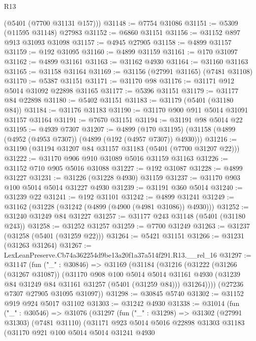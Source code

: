 \begin{lexlean}{R13}
\begin{coremodule}
      (@5401 (@7700 @31131 @157)))
@31148 := @7754 @31086
@31151 := @5309 (@11595 @31148) @27983
@31152 := @6860 @31151
@31156 := @31152 @897 @913 @31093 @31098
@31157 := @4945 @27905
@31158 := @4899 @31157
@31159 := @192 @31095
@31160 := @4899 @31159
@31161 := @170 @31097
@31162 := @4899 @31161
@31163 := @31162 @4930
@31164 := @31160 @31163
@31165 := @31158 @31164
@31169 := @31156 (@27991 @31165) (@7481 @31108)
@31170 := @5387 @31151
@31171 := @31170 @98
@31176 := @31171 @912 @5014 @31092 @22898 @31165
@31177 := @5396 @31151
@31179 := @31177 @84 @22898
@31180 := @5402 @31151
@31183 := @31179 (@5401 (@31180 @84))
@31184 := @31176 @31183
@31190 := @31170 @900 @911 @5014 @31091 @31157 @31164
@31191 := @7670 @31151
@31194 := @31191 @98 @5014 @22
@31195 := @4939 @7307
@31207 := @4899
    (@170 @31195)
    (@31158 (@4899 (@4952 (@4953 @7307)) (@4899 (@192 (@4957 @7307)) @4930)))
@31216 := @31190 (@31194 @31207 @84 @31157 @31183 (@5401 (@7700 @31207 @22)))
@31222 := @31170 @906 @910 @31089 @5016 @31159 @31163
@31226 := @31152 @710 @905 @5016 @31088
@31227 := @192 @31087
@31228 := @4899 @31227
@31231 := @31226 (@31228 @4930) @31159
@31237 := @31170 @903 @100 @5014 @5014 @31227 @4930
@31239 := @31191 @360 @5014
@31240 := @31239 @22
@31241 := @192 @31101
@31242 := @4899 @31241
@31249 := @31162 (@31228 (@31242 (@4899 (@4900 (@4981 @31086)) @4930)))
@31252 := @31240 @31249 @84 @31227
@31257 := @31177 @243 @31148 (@5401 (@31180 @243))
@31258 := @31252 @31257
@31259 := @7700 @31249
@31263 := @31237 (@31258 (@5401 (@31259 @22)))
@31264 := @5421 @31151
@31266 := @31231 (@31263 @31264)
@31267 := LexLeanPreserve.Cb74a362254d9be13a20f1a37a514f291.R13.__rel_16
@31297 := @31147
    (fun ("_" : @30846) =>
    @31169
      (@31184
        (@31216
          (@31222
            (@31266 (@31267 @31087))
            (@31170
              @908
              @100
              @5014
              @5014
              @31161
              @4930
              (@31239 @84 @31249 @84 @31161 @31257 (@5401 (@31259 @84)))
              @31264))))
      (@27236 @7307 @27905 @31095 @31097))
@31298 := @30845 @5740
@31302 := @31152 @919 @924 @5017 @31102
@31303 := @31242 @4930
@31338 := @31014
    (fun ("_" : @30546) =>
    @31076
      (@31297
        (fun ("_" : @31298) =>
        @31302
          (@27991 @31303)
          (@7481 @31110)
          (@31171
            @923
            @5014
            @5016
            @22898
            @31303
            @31183
            (@31170
              @921
              @100
              @5014
              @5014
              @31241
              @4930

\end{coremodule}
\end{lexlean}
